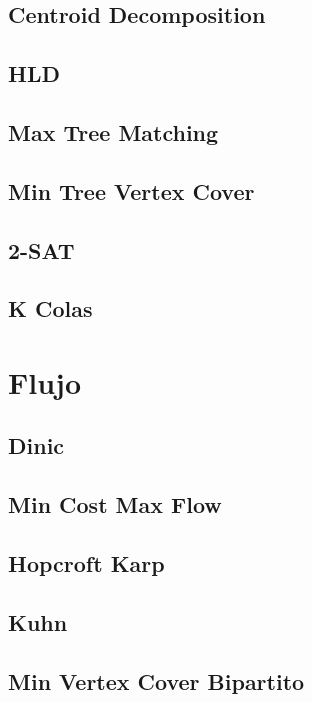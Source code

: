 \documentclass[a4paper,11pt,landscape,twocolumn]{article}
\begin{document}
\subsection{Centroid Decomposition}

\subsection{HLD}

\subsection{Max Tree Matching}

\subsection{Min Tree Vertex Cover}

\subsection{2-SAT}

\subsection{K Colas}


\section{Flujo} %
\subsection{Dinic}

\subsection{Min Cost Max Flow}

\subsection{Hopcroft Karp}

\subsection{Kuhn}

\subsection{Min Vertex Cover Bipartito}

\end{document}
